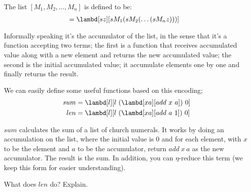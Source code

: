 \documentclass[../../../include/open-logic-section]{subfiles}
\begin{document}

The list $[M_1, M_2, \ldots, M_n]$ is defined to be:
\begin{align*}
  [M_1, M_2, \ldots, M_n] &= \lambd[sz][s M_1 (s M_2 (\ldots (s M_n z)))]
\end{align*}

Informally speaking it's the accumulator of the list, in the sense
that it's a function accepting two terms; the first is a function that receives accumulated value
along with a new element and returns the new accumulated value; the
second is the initial accumulated value; it accumulate elements one by
one and finally returns the result.

We can easily define some useful functions based on this encoding; 
\begin{align*}
  {sum} &= \lambd[l][l ~ (\lambd[xa][add ~ x ~ a])~  0]\\
  len &= \lambd[l][l ~ (\lambd[xa][add ~ a ~ 1]) ~ 0]
\end{align*}

$sum$ calculates the sum of a list of church numerals. It works by
doing an accumulation on the list, where the initial value is $0$ and
for each element, with $x$ to be the element and $a$ to be the
accumulator, return $add ~ x ~ a$ as the new accumulator. The result
is the sum. In addition, you can $\eta$-reduce this term (we keep this form for
easier understanding).

\begin{prob}
  What does $len$ do? Explain.
\end{prob}
\end{document}
